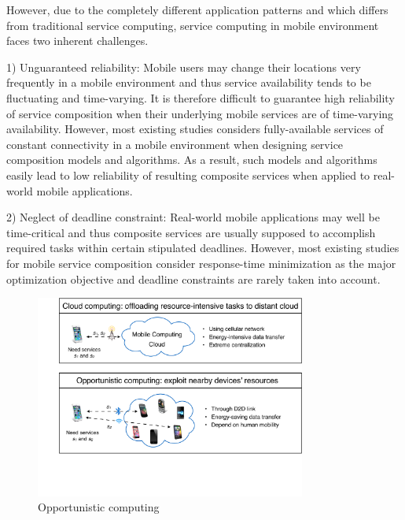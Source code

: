 \documentclass[journal]{IEEEtran}
\begin{document}
However, due to the completely different application patterns and which differs from traditional service computing, service computing in mobile environment faces two inherent challenges.

1) Unguaranteed reliability: Mobile users may change their locations very frequently in a mobile environment and thus service availability tends to be fluctuating and time-varying. It is therefore difficult to guarantee high reliability of service composition when their underlying mobile services are of time-varying availability. However, most existing studies considers fully-available services of constant connectivity in a mobile environment when designing service composition models and algorithms. As a result, such models and algorithms easily lead to low reliability of resulting composite services when applied to real-world mobile applications.

2) Neglect of deadline constraint: Real-world mobile applications may well be time-critical and thus composite services are usually supposed to accomplish required tasks within certain stipulated deadlines. However, most existing studies for mobile service composition consider response-time minimization as the major optimization objective and deadline constraints are rarely taken into account.

\begin{figure}[!t]
\centering
\includegraphics[width=3.5in]{./img/pic1.pdf}
\caption{Opportunistic computing}
\label{Opportunistic computing}
\end{figure}

\end{document}
